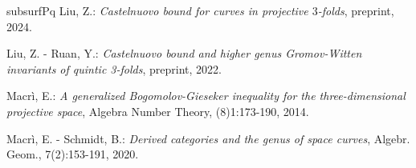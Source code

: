 \documentclass[9pt,a4paper]{amsart}
\theoremstyle{plain}
\theoremstyle{definition}
\theoremstyle{remark}
\begin{document}
\begin{thebibliography}{subsurfPq}
 Liu, Z.:
{\it Castelnuovo bound for curves in projective $3$-folds}, preprint, 2024.


 Liu, Z. - Ruan, Y.:
{\it Castelnuovo bound and higher genus Gromov-Witten invariants of
quintic 3-folds}, preprint, 2022.


 Macr\`i, E.:
{\it A generalized Bogomolov-Gieseker inequality for the
three-dimensional projective space}, Algebra Number Theory,
(8)1:173-190, 2014.


 Macr\`i, E. - Schmidt, B.:
{\it Derived categories and the genus of space curves}, Algebr.
Geom., 7(2):153-191, 2020.





\end{thebibliography}
\end{document}
